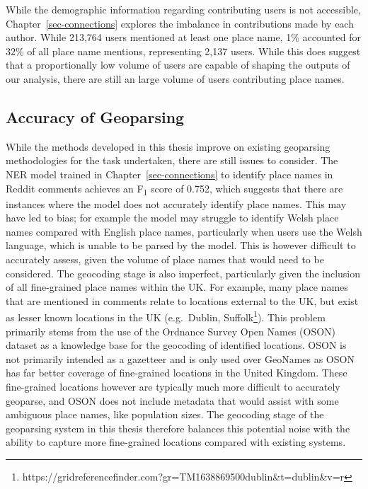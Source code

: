 \documentclass[
  letterpaper,
  11pt,
  english,
  onehalfspacing,
  headsepline]{MastersDoctoralThesis}
\begin{document}
While the demographic information regarding contributing users is not
accessible, Chapter~\ref{sec-connections} explores the imbalance in
contributions made by each author. While 213,764 users mentioned at
least one place name, 1\% accounted for 32\% of all place name mentions,
representing 2,137 users. While this does suggest that a proportionally
low volume of users are capable of shaping the outputs of our analysis,
there are still an large volume of users contributing place names.

\hypertarget{accuracy-of-geoparsing}{%
\subsection{Accuracy of Geoparsing}\label{accuracy-of-geoparsing}}

While the methods developed in this thesis improve on existing
geoparsing methodologies for the task undertaken, there are still issues
to consider. The NER model trained in Chapter~\ref{sec-connections} to
identify place names in Reddit comments achieves an F\textsubscript{1}
score of 0.752, which suggests that there are instances where the model
does not accurately identify place names. This may have led to bias; for
example the model may struggle to identify Welsh place names compared
with English place names, particularly when users use the Welsh
language, which is unable to be parsed by the model. This is however
difficult to accurately assess, given the volume of place names that
would need to be considered. The geocoding stage is also imperfect,
particularly given the inclusion of all fine-grained place names within
the UK. For example, many place names that are mentioned in comments
relate to locations external to the UK, but exist as lesser known
locations in the UK (e.g.~Dublin, Suffolk\footnote{https://gridreferencefinder.com?gr=TM1638869500\textbar dublin\&t=dublin\&v=r}).
This problem primarily stems from the use of the Ordnance Survey Open
Names (OSON) dataset as a knowledge base for the geocoding of identified
locations. OSON is not primarily intended as a gazetteer and is only
used over GeoNames as OSON has far better coverage of fine-grained
locations in the United Kingdom. These fine-grained locations however
are typically much more difficult to accurately geoparse, and OSON does
not include metadata that would assist with some ambiguous place names,
like population sizes. The geocoding stage of the geoparsing system in
this thesis therefore balances this potential noise with the ability to
capture more fine-grained locations compared with existing systems.
\end{document}
